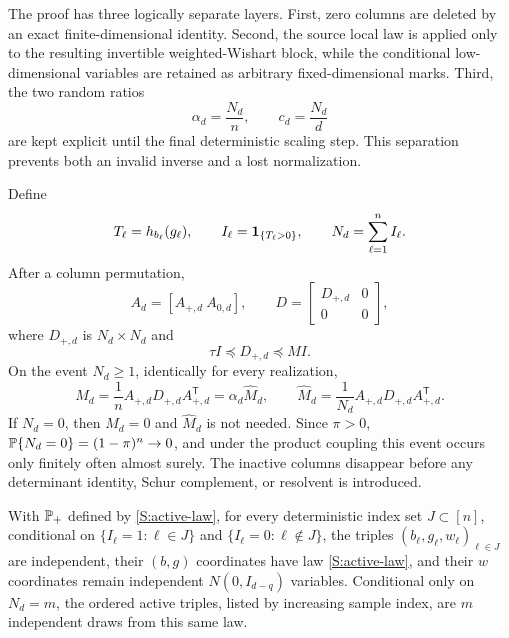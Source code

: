 The proof has three logically separate layers. First, zero columns are deleted by an exact
finite-dimensional identity. Second, the source local law is applied only to the resulting
invertible weighted-Wishart block, while the conditional low-dimensional variables are retained
as arbitrary fixed-dimensional marks. Third, the two random ratios
\begin{equation}
\alpha_d=\frac{N_d}{n},
\qquad
c_d=\frac{N_d}{d}
\label{S:two-ratios}
\end{equation}
are kept explicit until the final deterministic scaling step. This separation prevents both an
invalid inverse and a lost normalization.

Define
\begin{equation}
T_\ell=h_{b_\ell}(g_\ell),\qquad
I_\ell=\mathbf{1}_{\{T_\ell>0\}},\qquad
N_d=\sum_{\ell=1}^n I_\ell.
\end{equation}
After a column permutation,
\begin{equation}
A_d=[A_{+,d}\ A_{0,d}],\qquad
D=\begin{bmatrix}D_{+,d}&0\\0&0\end{bmatrix},
\end{equation}
where $D_{+,d}$ is $N_d\times N_d$ and
\begin{equation}
\tau I\preceq D_{+,d}\preceq MI.
\end{equation}
On the event $N_d\ge1$, identically for every realization,
\begin{equation}
M_d
=\frac1nA_{+,d}D_{+,d}A_{+,d}^{\mathsf T}
=\alpha_d\widehat M_d,
\qquad
\widehat M_d=
\frac1{N_d}A_{+,d}D_{+,d}A_{+,d}^{\mathsf T}.
\label{S:activeidentity}
\end{equation}
If $N_d=0$, then $M_d=0$ and $\widehat M_d$ is not needed. Since $\pi>0$,
$\mathbb{P}\{N_d=0\}=(1-\pi)^n\to0$, and under the product coupling this event
occurs only finitely often almost surely. The inactive columns disappear
before any determinant identity, Schur complement, or resolvent is introduced.

\begin{lemma}
\label{S:active-law-lemma}
With $\mathbb{P}_+$ defined by \eqref{S:active-law}, for every deterministic
index set $J\subset[n]$, conditional on
$\{I_\ell=1:\ell\in J\}$ and $\{I_\ell=0:\ell\notin J\}$, the triples
$(b_\ell,g_\ell,w_\ell)_{\ell\in J}$ are independent, their $(b,g)$
coordinates have law \eqref{S:active-law}, and their $w$ coordinates remain independent
$N(0,I_{d-q})$ variables. Conditional only on $N_d=m$, the ordered active triples, listed
by increasing sample index, are $m$ independent draws from this same law.
\end{lemma}

